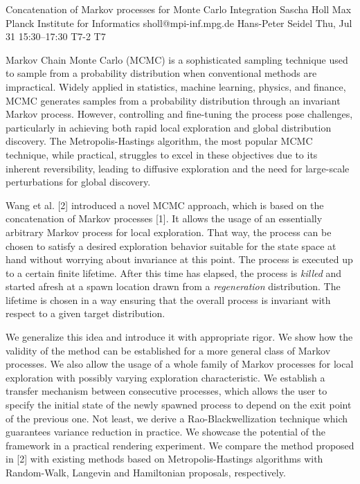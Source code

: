 \begin{talk}
  {Concatenation of Markov processes for Monte Carlo Integration}%
  {Sascha Holl}%
  {Max Planck Institute for Informatics}%
  {sholl@mpi-inf.mpg.de}%
  {Hans-Peter Seidel}%
  {}%
  {Thu, Jul 31 15:30–17:30}%
  {T7-2}%
  {T7}%
  
				

Markov Chain Monte Carlo (MCMC) is a sophisticated sampling technique used to sample from a probability distribution when conventional methods are impractical. Widely applied in statistics, machine learning, physics, and finance, MCMC generates samples from a probability distribution through an invariant Markov process. However, controlling and fine-tuning the process pose challenges, particularly in achieving both rapid local exploration and global distribution discovery. The Metropolis-Hastings algorithm, the most popular MCMC technique, while practical, struggles to excel in these objectives due to its inherent reversibility, leading to diffusive exploration and the need for large-scale perturbations for global discovery.

Wang et al. [2] introduced a novel MCMC approach, which is based on the concatenation of Markov processes [1]. It allows the usage of an essentially arbitrary Markov process for local exploration. That way, the process can be chosen to satisfy a desired exploration behavior suitable for the state space at hand without worrying about invariance at this point. The process is executed up to a certain finite lifetime. After this time has elapsed, the process is \textit{killed} and started afresh at a spawn location drawn from a \textit{regeneration} distribution. The lifetime is chosen in a way ensuring that the overall process is invariant with respect to a given target distribution.

We generalize this idea and introduce it with appropriate rigor. We show how the validity of the method can be established for a more general class of Markov processes. We also allow the usage of a whole family of Markov processes for local exploration with possibly varying exploration characteristic. We establish a transfer mechanism between consecutive processes, which allows the user to specify the initial state of the newly spawned process to depend on the exit point of the previous one. Not least, we derive a Rao-Blackwellization technique which guarantees variance reduction in practice.
We showcase the potential of the framework in a practical rendering experiment. We compare the method proposed in [2] with existing methods based on Metropolis-Hastings algorithms with Random-Walk, Langevin and Hamiltonian proposals, respectively.


\end{talk}
